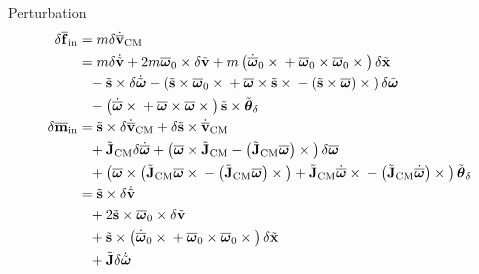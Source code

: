 \documentclass[10pt,dvips,fleqn,subeqn]{report}
\newcommand{\T}[1]{\bm{\mathbf{#1}}}
\newcommand{\TT}[1]{\bm{\mathbf{#1}}}
\begin{document}
Perturbation
\begin{subequations}
\begin{align}
	\delta\overline{\T{f}}_{\text{in}}
	&= m \delta\dot{\overline{\T{v}}}_{\text{CM}}
	\nonumber \\
	&= m \delta\dot{\tilde{\T{v}}}
	+ 2 m \overline{\T{\omega}}_0 \times \delta\tilde{\T{v}}
	+ m \plbr{
		\dot{\overline{\T{\omega}}}_0 \times{}
		+ \overline{\T{\omega}}_0 \times \overline{\T{\omega}}_0 \times{}
	} \delta\tilde{\T{x}}
	\nonumber \\ &\hphantom{=}
	- \tilde{\T{s}} \times \delta\dot{\tilde{\T{\omega}}}
	- \plbr{
		\tilde{\T{s}} \times \overline{\T{\omega}}_0 \times{}
		+ \overline{\T{\omega}} \times \tilde{\T{s}} \times{}
		- \plbr{\tilde{\T{s}} \times \overline{\T{\omega}}} \times{}
	} \delta\tilde{\T{\omega}}
	\nonumber \\ &\hphantom{=}
	- \plbr{
		\dot{\overline{\T{\omega}}} \times{}
		+ \overline{\T{\omega}} \times \overline{\T{\omega}} \times{}
	} \tilde{\T{s}} \times \tilde{\T{\theta}}_{\delta}
	\\
%
	\delta\overline{\T{m}}_{\text{in}}
	&= \tilde{\T{s}} \times \delta\dot{\overline{\T{v}}}_{\text{CM}}
	+ \delta\tilde{\T{s}} \times \dot{\overline{\T{v}}}_{\text{CM}}
	\nonumber \\ &\hphantom{=}
	+ \tilde{\TT{J}}_{\text{CM}} \delta\dot{\overline{\T{\omega}}}
	+ \plbr{
		\overline{\T{\omega}} \times \tilde{\TT{J}}_{\text{CM}}
		- \plbr{\tilde{\TT{J}}_{\text{CM}} \overline{\T{\omega}}} \times{}
	} \delta\overline{\T{\omega}}
	\nonumber \\ &\hphantom{=}
	+ \plbr{
		\overline{\T{\omega}} \times \plbr{
			\tilde{\TT{J}}_{\text{CM}} \overline{\T{\omega}} \times{}
			- \plbr{\tilde{\TT{J}}_{\text{CM}} \overline{\T{\omega}}} \times{}
		}
		+ \tilde{\TT{J}}_{\text{CM}} \dot{\overline{\T{\omega}}} \times{}
		- \plbr{\tilde{\TT{J}}_{\text{CM}} \dot{\overline{\T{\omega}}}} \times{}
	} \tilde{\T{\theta}}_{\delta}
	\nonumber \\
	&= \tilde{\T{s}} \times \delta\dot{\tilde{\T{v}}}
	\nonumber \\ &\hphantom{=}
	+ 2 \tilde{\T{s}} \times \overline{\T{\omega}}_0 \times \delta\tilde{\T{v}}
	\nonumber \\ &\hphantom{=}
	+ \tilde{\T{s}} \times \plbr{
		\dot{\overline{\T{\omega}}}_0 \times{}
		+ \overline{\T{\omega}}_0 \times \overline{\T{\omega}}_0 \times{}
	} \delta\tilde{\T{x}}
	\nonumber \\ &\hphantom{=}
	+ \tilde{\TT{J}} \delta\dot{\tilde{\T{\omega}}}

\end{align}
\end{subequations}
\end{document}
